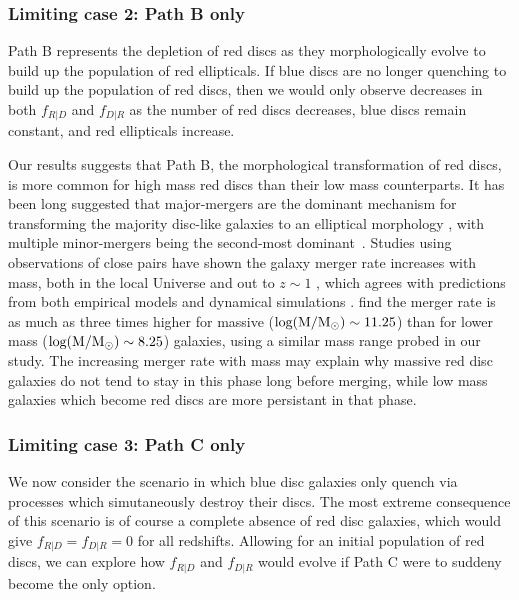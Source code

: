 \documentclass[useAMS,usenatbib]{mn2e}
\begin{document}
\subsubsection{Limiting case 2: Path B only}

Path B represents the depletion of red discs as they morphologically evolve to build up the population of red ellipticals. If blue discs are no longer quenching to build up the population of red discs, then we would only observe decreases in both $f_{R|D}$ and $f_{D|R}$ as the number of red discs decreases, blue discs remain constant, and red ellipticals increase. 

Our results suggests that Path B, the morphological transformation of red discs, is more common for high mass red discs than their low mass counterparts. It has been long suggested that major-mergers are the dominant mechanism for transforming the majority disc-like galaxies to an elliptical morphology \citep{Toomre1977,Schweizer1982,Schweizer1990}, with multiple minor-mergers being the second-most dominant~\citep{Bundy2009,Hopkins2010b}. Studies using observations of close pairs have shown the galaxy merger rate increases with mass, both in the local Universe \citep{Xu2004,Patton2008,Domingue2009,Robotham2014,Casteels2014} and out to $z\sim1$ \citep{Xu2012,Bundy2009}, which agrees with predictions from both empirical models and dynamical simulations \citep{Hopkins2010a,Hopkins2010b,Maller2006}. \citet{Casteels2014} find the merger rate is as much as three times higher for massive ($\rm log(M/M_{\odot})\sim11.25$) than for lower mass ($\rm log(M/M_{\odot})\sim8.25$) galaxies, using a similar mass range probed in our study. The increasing merger rate with mass may explain why massive red disc galaxies do not tend to stay in this phase long before merging, while low mass galaxies which become red discs are more persistant in that phase. 
 

\subsubsection{Limiting case 3: Path C only}
We now consider the scenario in which blue disc galaxies only quench via processes which simutaneously destroy their discs. The most extreme consequence of this scenario is of course a complete absence of red disc galaxies, which would give $f_{R|D}=f_{D|R}=0$ for all redshifts. Allowing for an initial population of red discs, we can explore how $f_{R|D}$ and $f_{D|R}$ would evolve if Path C were to suddeny become the only option. 
\end{document}
